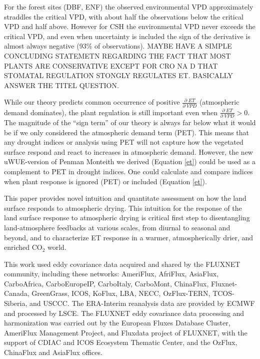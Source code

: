 \documentclass[draft,linenumbers]{agujournal}
\begin{document}
For the forest sites (DBF, ENF) the observed environmental VPD approximately straddles the critical VPD, with about half the observations below the critical VPD and half above. However for CSH the environmental VPD never exceeds the critical VPD, and even when uncertainty is included the sign of the derivative is almost always negative (93\% of observations).
MAYBE HAVE A SIMPLE CONCLUDING STATEMETN REGARDING THE FACT THAT MOST PLANTS ARE CONSERVATIVE EXCEPT FOR CRO NA D THAT STOMATAL REGULATION STONGLY REGULATES ET. BASICALLY ANSWER THE TITEL QUESTION.

While our theory predicts common occurrence of positive $\frac{\partial \; ET}{\partial \; VPD}$ (atmospheric demand dominates), the plant regulation is still important even when $\frac{\partial \; ET}{\partial \; VPD} > 0$. The magnitude of the ``sign term'' of our theory is always far below what it would be if we only considered the atmospheric demand term (PET). This means that any drought indices or analysis using PET will not capture how the vegetated surface respond and react to increases in atmospheric demand. However, the new uWUE-version of Penman Monteith we derived (Equation \ref{et}) could be used as a complement to PET in drought indices. One could calculate and compare indices  when plant response is ignored (PET) or included (Equation \ref{et}). 

This paper provides novel intuition and quantitate assessment on how the land surface responds to atmospheric drying. This intuition for the response of the land surface response to atmospheric drying is critical first step to disentangling land-atmosphere feedbacks at various scales, from diurnal to seasonal and beyond, and to characterize ET response in a warmer, atmospherically drier, and enriched CO$_2$ world. 


\acknowledgments
This work used eddy covariance data acquired and shared by the FLUXNET community, including these networks: AmeriFlux, AfriFlux, AsiaFlux, CarboAfrica, CarboEuropeIP, CarboItaly, CarboMont, ChinaFlux, Fluxnet-Canada, GreenGrass, ICOS, KoFlux, LBA, NECC, OzFlux-TERN, TCOS-Siberia, and USCCC. The ERA-Interim reanalysis data are provided by ECMWF and processed by LSCE. The FLUXNET eddy covariance data processing and harmonization was carried out by the European Fluxes Database Cluster, AmeriFlux Management Project, and Fluxdata project of FLUXNET, with the support of CDIAC and ICOS Ecosystem Thematic Center, and the OzFlux, ChinaFlux and AsiaFlux offices.

%


\listofchanges
\end{document}
